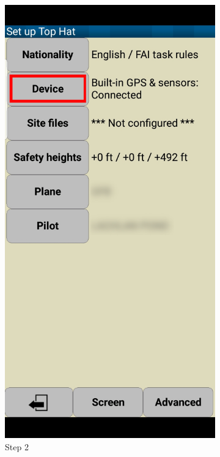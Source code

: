 \documentclass{article}
\begin{document}
\begin{figure}[h!]
\begin{subfigure}[b]{0.24\linewidth}
            \includegraphics[width=\linewidth]{images/Tophat-2.jpg}
            \caption{Step 2}
        \end{subfigure}
        \begin{subfigure}[b]{0.24\linewidth}

\end{subfigure}
\end{figure}
\end{document}
